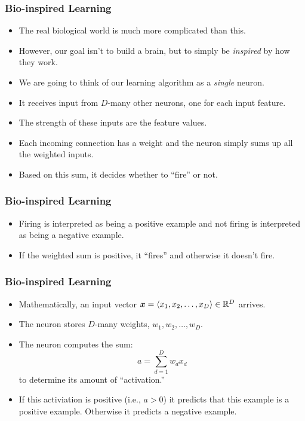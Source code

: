\documentclass[trans]{beamer}
\begin{document}
\begin{frame}
  \frametitle{Bio-inspired Learning}
\begin{itemize}
\item The real biological world is much more complicated than this.
\item However, our goal isn't to build a brain, but to simply be
\emph{inspired} by how they work. 
\item We are going to think of our
learning algorithm as a \emph{single} neuron. 
\item It receives input from
$D$-many other neurons, one for each input feature.  
\item The strength of
these inputs are the feature values.  
\item Each incoming connection has a weight
and the neuron simply sums up all the weighted inputs.
\item  Based on this
sum, it decides whether to ``fire'' or not.
\end{itemize}
\end{frame}
\begin{frame}
  \frametitle{Bio-inspired Learning}
\begin{itemize}
\item  Firing is interpreted as
being a positive example and not firing is interpreted as being a
negative example. 
\item If the weighted sum is positive, it
``fires'' and otherwise it doesn't fire.
\end{itemize}
\end{frame}
\begin{frame}
  \frametitle{Bio-inspired Learning}
\begin{itemize}
\item
Mathematically, an input vector ${\boldsymbol{x}} = \langle x_1, x_2, \dots, x_D
\rangle\in \mathbb{R}^D$ arrives. 
\item The neuron stores $D$-many weights, $w_1, w_2,
\dots, w_D$.  
\item The neuron computes the sum:
\begin{equation} \label{eq:perc:sum}
a = \sum_{d=1}^D w_d x_d
\end{equation}
to determine its amount of ``activation.''
\item  If this activiation is
positive (i.e., $a > 0$) it predicts that this example is a positive
example.  Otherwise it predicts a negative example.
\end{itemize}
\end{frame}
\end{document}
